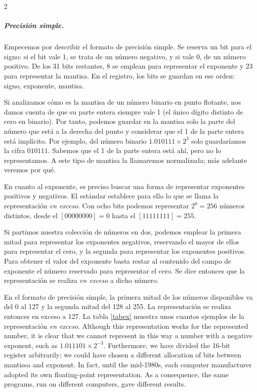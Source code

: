 \begin{paracol}{2}
\subparagraph*{Precisión simple.} Empecemos por describir el formato de precisión simple. Se reserva un bit para el signo: si el bit vale 1, se trata de un número negativo, y si vale 0, de un número positivo. De los 31 bits restantes, 8 se emplean para representar el exponente y 23 para representar la mantisa. En el registro, los bits se guardan en ese orden: signo, exponente, mantisa.

Si analizamos cómo es la mantisa de un número binario en punto flotante, nos damos cuenta de que su parte entera siempre vale 1 (el único dígito distinto de cero en binario). Por tanto, podemos guardar en la mantisa solo la parte del número que está a la derecha del punto y considerar que el 1 de la parte entera está implícito. Por ejemplo, del número binario $1.010111\times 2^{3}$ solo guardaríamos la cifra $010111$. Sabemos que el 1 de la parte entera está ahí, pero no lo representamos. A este tipo de mantisa la llamaremos normalizada; más adelante veremos por qué.

 En cuanto al exponente, es preciso buscar una forma de representar exponentes positivos y negativos. El estándar establece para ello lo que se llama la representación \emph{en exceso}. Con ocho bits podemos representar $2^8=256$ números distintos, desde el $[00000000]=0$ hasta el $[11111111]=255$.

Si partimos nuestra colección de números en dos, podemos emplear la primera mitad para representar los exponentes negativos, reservando el mayor de ellos para representar el cero, y la segunda para representar los exponentes positivos. Para obtener el valor del exponente basta restar al contenido del campo de exponente el número reservado para representar el cero. Se dice entonces que la representación se realiza \emph{en exceso} a dicho número.

En el formato de precisión simple, la primera mitad de los números disponibles va del 0 al 127 y la segunda mitad del 128 al 255. La representación se realiza entonces en exceso a 127. La tabla \ref{tabex} muestra unos cuantos ejemplos de la representación \emph{en exceso}.
\switchcolumn
Although this representation works for the represented number, it is clear that we cannot represent in this way a number with a negative exponent, such as $1.011101\times 2^{-3}$. Furthermore, we have divided the 16-bit register arbitrarily; we could have chosen a different allocation of bits between mantissa and exponent. In fact, until the mid-1980s, each computer manufacturer adopted its own floating-point representation. As a consequence, the same programs, run on different computers, gave different results.


\end{paracol}
